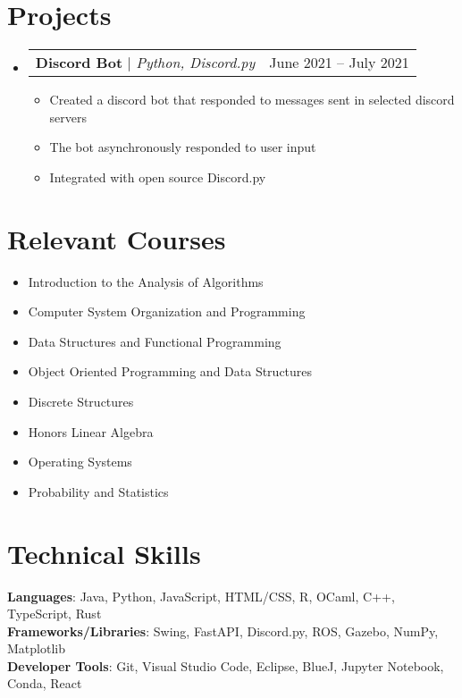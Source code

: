 \documentclass[letterpaper,11pt]{article}
\makeatletter
\newcommand{\resumeItem}[1]{
  \item\small{
    {#1 \vspace{-2pt}}
  }
}
\newcommand{\resumeProjectHeading}[2]{
    \item
    \begin{tabular*}{0.97\textwidth}{l@{\extracolsep{\fill}}r}
      \small#1 & #2 \\
    \end{tabular*}\vspace{-7pt}
}
\newcommand{\resumeSubHeadingListStart}{\begin{itemize}[leftmargin=0.15in, label={}]}
\newcommand{\resumeSubHeadingListEnd}{\end{itemize}}
\newcommand{\resumeItemListStart}{\begin{itemize}}
\newcommand{\resumeItemListEnd}{\end{itemize}\vspace{-5pt}}
\makeatother
\begin{document}
\section{Projects}
\resumeSubHeadingListStart
\resumeProjectHeading
{\textbf{Discord Bot} $|$ \emph{Python, Discord.py}}{June 2021 -- July 2021}
\resumeItemListStart
\resumeItem{Created a discord bot that responded to messages sent in selected discord servers}
\resumeItem{The bot asynchronously responded to user input}
\resumeItem{Integrated with open source Discord.py}
\resumeItemListEnd
\resumeSubHeadingListEnd

\section{Relevant Courses}
\begin{multicols}{2}\small
  \begin{itemize}[noitemsep,topsep=0pt,parsep=0pt,partopsep=0pt]
    \item Introduction to the Analysis of Algorithms
    \item Computer System Organization and Programming
    \item Data Structures and Functional Programming
    \item Object Oriented Programming and Data Structures
    \item Discrete Structures
    \item Honors Linear Algebra
    \item Operating Systems
    \item Probability and Statistics
  \end{itemize}\normalsize
\end{multicols}




%
\section{Technical Skills}
\begin{itemize}[leftmargin=0.15in, label={}]
  \small{\item{
                \textbf{Languages}{: Java, Python, JavaScript, HTML/CSS, R, OCaml, C++, TypeScript, Rust} \\
                \textbf{Frameworks/Libraries}{: Swing, FastAPI, Discord.py, ROS, Gazebo, NumPy, Matplotlib} \\
                \textbf{Developer Tools}{: Git, Visual Studio Code, Eclipse, BlueJ, Jupyter Notebook, Conda, React}
          }}
\end{itemize}


\end{document}
